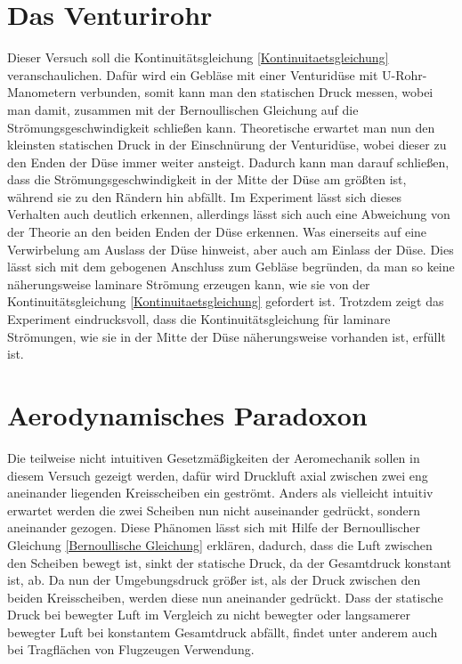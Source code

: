 \section{Das Venturirohr}

Dieser Versuch soll die Kontinuitätsgleichung \ref{Kontinuitaetsgleichung} veranschaulichen. Dafür wird ein Gebläse mit einer Venturidüse mit U-Rohr-Manometern verbunden, somit kann man den statischen Druck messen, wobei man damit, zusammen mit der Bernoullischen Gleichung auf die Strömungsgeschwindigkeit schließen kann. Theoretische erwartet man nun den kleinsten statischen Druck in der Einschnürung der Venturidüse, wobei dieser zu den Enden der Düse immer weiter ansteigt. Dadurch kann man darauf schließen, dass die Strömungsgeschwindigkeit in der Mitte der Düse am größten ist, während sie zu den Rändern hin abfällt. Im Experiment lässt sich dieses Verhalten auch deutlich erkennen, allerdings lässt sich auch eine Abweichung von der Theorie an den beiden Enden der Düse erkennen. Was einerseits auf eine Verwirbelung am Auslass der Düse hinweist, aber auch am Einlass der Düse. Dies lässt sich mit dem gebogenen Anschluss zum Gebläse begründen, da man so keine näherungsweise laminare Strömung erzeugen kann, wie sie von der Kontinuitätsgleichung \ref{Kontinuitaetsgleichung} gefordert ist. Trotzdem zeigt das Experiment eindrucksvoll, dass die Kontinuitätsgleichung für laminare Strömungen, wie sie in der Mitte der Düse näherungsweise vorhanden ist, erfüllt ist.

\section{Aerodynamisches Paradoxon}

Die teilweise nicht intuitiven Gesetzmäßigkeiten der Aeromechanik sollen in diesem Versuch gezeigt werden, dafür wird Druckluft axial zwischen zwei eng aneinander liegenden Kreisscheiben ein geströmt. Anders als vielleicht intuitiv erwartet werden die zwei Scheiben nun nicht auseinander gedrückt, sondern aneinander gezogen. Diese Phänomen lässt sich mit Hilfe der Bernoullischer Gleichung \ref{Bernoullische Gleichung} erklären, dadurch, dass die Luft zwischen den Scheiben bewegt ist, sinkt der statische Druck, da der Gesamtdruck konstant ist, ab. Da nun der Umgebungsdruck größer ist, als der Druck zwischen den beiden Kreisscheiben, werden diese nun aneinander gedrückt. Dass der statische Druck bei bewegter Luft im Vergleich zu nicht bewegter oder langsamerer bewegter Luft bei konstantem Gesamtdruck abfällt, findet unter anderem auch bei Tragflächen von Flugzeugen Verwendung.